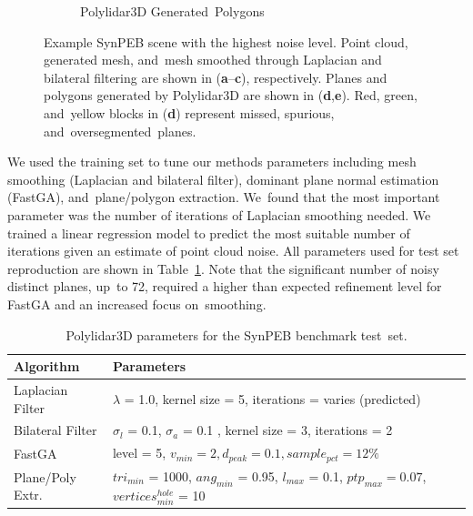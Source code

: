\begin{figure}[H]
\begin{subfigure}[t]{.45\linewidth}
    \caption{\label{fig:ch3_synpeb_e}Polylidar3D Generated~Polygons}
  \end{subfigure}
  \caption{Example SynPEB scene with the highest noise level. Point cloud, generated mesh, and~mesh  smoothed through Laplacian and bilateral filtering are shown in (\textbf{a}--\textbf{c}), respectively.  Planes and polygons generated by Polylidar3D are shown in (\textbf{d},\textbf{e}). Red, green, and~yellow blocks in (\textbf{d}) represent missed, spurious, and~oversegmented~planes.}\label{fig:ch3_synpeb_pics}
\end{figure}

We used the training set to tune our methods parameters including mesh smoothing (Laplacian and bilateral filter), dominant plane normal estimation (FastGA), and~plane/polygon extraction. We~found that the most important parameter was the number of iterations of Laplacian smoothing needed. We trained a linear regression model to predict the most suitable number of iterations given an estimate of point cloud noise. All parameters used for test set reproduction are shown in Table~\ref{table:synpeb_parameters}. Note that the significant number of noisy distinct planes, up~to 72, required a higher than expected refinement level for FastGA and an increased focus on~smoothing.


\begin{table}[H]
\centering
\caption{Polylidar3D parameters for the SynPEB benchmark test~set.}\label{table:synpeb_parameters}
\begin{tabular}{@{}ll@{}}
\toprule
\textbf{Algorithm}        & \textbf{Parameters}                                                          \\ \midrule
Laplacian Filter & $\lambda$ = 1.0, kernel size = 5, iterations = varies (predicted)   \\
Bilateral Filter & $\sigma_l$ = 0.1, $\sigma_a$ = 0.1 , kernel size = 3, iterations = 2 \\
FastGA           & level = 5,  $v_{min} = 2, d_{peak} = 0.1, sample_{pct} = 12\%$            \\
Plane/Poly Extr.      & $tri_{min}$ = 1000, $ang_{min}$ = 0.95, $l_{max}$ = 0.1, $ptp_{max} = 0.07$, $vertices^{hole}_{min}$ = 10     \\ \bottomrule
\end{tabular}
\end{table}


